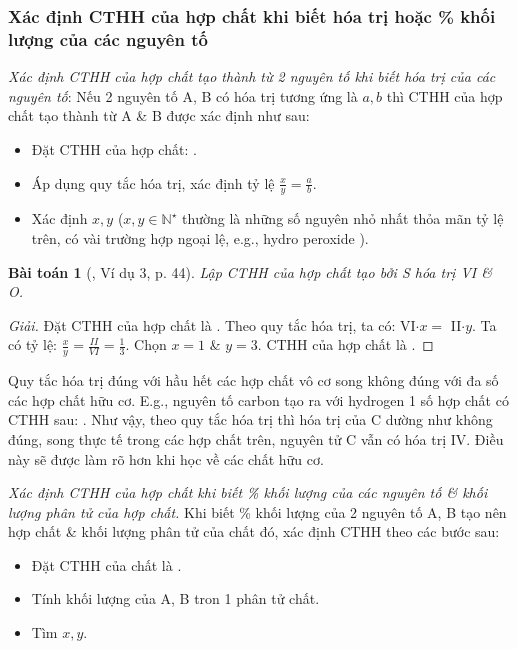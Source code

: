 \documentclass{article}
\newtheorem{baitoan}{Bài toán}
\begin{document}
\subsubsection{Xác định CTHH của hợp chất khi biết hóa trị hoặc \% khối lượng của các nguyên tố}
 \textit{Xác định CTHH của hợp chất tạo thành từ 2 nguyên tố khi biết hóa trị của các nguyên tố}: Nếu 2 nguyên tố A, B có hóa trị tương ứng là $a,b$ thì CTHH của hợp chất tạo thành từ A \& B được xác định như sau:
\begin{itemize}
	\item Đặt CTHH của hợp chất: .
	\item Áp dụng quy tắc hóa trị, xác định tỷ lệ $\frac{x}{y} = \frac{a}{b}$.
	\item Xác định $x,y$ ($x,y\in\mathbb{N}^\star$ thường là những số nguyên nhỏ nhất thỏa mãn tỷ lệ trên, có vài trường hợp ngoại lệ, e.g., hydro peroxide ).
\end{itemize}

\begin{baitoan}[\cite{SGK_KHTN_7_Canh_Dieu}, Ví dụ 3, p. 44]
	Lập CTHH của hợp chất tạo bởi \emph{S} hóa trị VI \& \emph{O}.
\end{baitoan}

\begin{proof}[Giải]
	Đặt CTHH của hợp chất là . Theo quy tắc hóa trị, ta có: VI$\cdot x =$ II$\cdot y$. Ta có tỷ lệ: $\frac{x}{y} = \frac{II}{VI} = \frac{1}{3}$. Chọn $x = 1$ \& $y = 3$. CTHH của hợp chất là .
\end{proof}
Quy tắc hóa trị đúng với hầu hết các hợp chất vô cơ song không đúng với đa số các hợp chất hữu cơ. E.g., nguyên tố carbon tạo ra với hydrogen 1 số hợp chất có CTHH sau: . Như vậy, theo quy tắc hóa trị thì hóa trị của C dường như không đúng, song thực  tế trong các hợp chất trên, nguyên tử C vẫn có hóa trị IV. Điều này sẽ được làm rõ hơn khi học về các chất hữu cơ.

\noindent{} \textit{Xác định CTHH của hợp chất khi biết \% khối lượng của các nguyên tố \& khối lượng phân tử của hợp chất.} Khi biết \% khối lượng của 2 nguyên tố A, B tạo nên hợp chất \& khối lượng phân tử của chất đó, xác định CTHH theo các bước sau:
\begin{itemize}
	\item Đặt CTHH của chất là .
	\item Tính khối lượng của A, B tron 1 phân tử chất.
	\item Tìm $x,y$.
\end{itemize}
\end{document}
